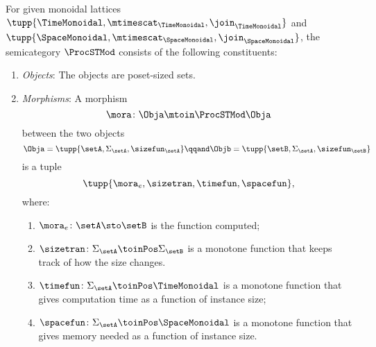 \begin{definition}
    \label{def:ProcSTMod}
    For given monoidal lattices~$\tupp{\TimeMonoidal, \mtimescat_{\TimeMonoidal}, \join_{\TimeMonoidal}}$ and~$\tupp{\SpaceMonoidal, \mtimescat_{\SpaceMonoidal}, \join_{\SpaceMonoidal}}$, the semicategory $\ProcSTMod$ consists of the following constituents:
    \begin{enumerate}
        \item \emph{Objects}: The objects are poset-sized sets.
        \item \emph{Morphisms}: A morphism
              \begin{equation}
                  \mora \colon \Obja \mtoin\ProcSTMod \Obja
              \end{equation}
              between the two objects
              \begin{equation}
                  \Obja = \tupp{\setA, \Sigma_{\setA}, \sizefun_{\setA}}
                  \qqand
                  \Objb = \tupp{\setB, \Sigma_{\setA}, \sizefun_{\setB}}
              \end{equation}
              is a tuple
              \begin{equation}
                  \tupp{\mora_e, \sizetran, \timefun, \spacefun },
              \end{equation}
              where:
              \begin{enumerate}
                  \item $\mora_e \colon \setA \sto \setB$ is the function computed;
                  \item $\sizetran\colon \Sigma_{\setA} \toinPos \Sigma_{\setB}$ is a monotone function that keeps track of how the size changes.
                  \item $\timefun\colon \Sigma_{\setA} \toinPos \TimeMonoidal$ is a monotone function that gives computation time as a function of instance size;
                  \item $\spacefun\colon \Sigma_{\setA} \toinPos \SpaceMonoidal$ is a monotone function that gives memory needed as a function of instance size.
              \end{enumerate}


\end{enumerate}
\end{definition}
